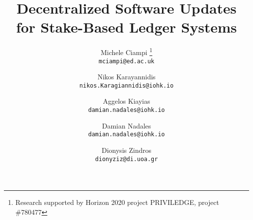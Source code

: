 \title{Decentralized Software Updates\\for Stake-Based Ledger Systems}

\author{
   Michele Ciampi 
     \fnmsep \thanks{Research supported by Horizon 2020 project PRIVILEDGE, 
   	  project \#780477} \\
     {\small \texttt{mciampi@ed.ac.uk}}\\
  \and	
  Nikos Karayannidis\\      
	{\small \texttt{nikos.Karagiannidis@iohk.io}} \\
  \and   
  Aggelos Kiayias \\
  {\small \texttt{damian.nadales@iohk.io}} \\
  \and   
  Damian Nadales \\
    {\small \texttt{damian.nadales@iohk.io}} \\
  \and
  Dionysis Zindros \\
   {\small \texttt{dionyziz@di.uoa.gr}}		
}

\let\oldaddcontentsline\addcontentsline
\def\addcontentsline#1#2#3{}
\maketitle
\def\addcontentsline#1#2#3{\oldaddcontentsline{#1}{#2}{#3}}